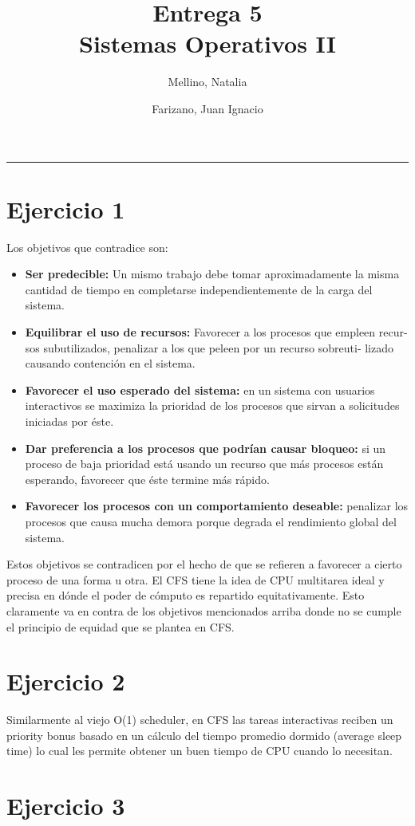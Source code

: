 \documentclass[11pt]{article}
\title{
    Entrega 5 \\
    \large Sistemas Operativos II}
\author{Mellino, Natalia \and Farizano, Juan Ignacio}
\date{}
\begin{document}
\maketitle

\noindent\rule{\textwidth}{1pt}

\section*{Ejercicio 1}

Los objetivos que contradice son:

\begin{itemize} 
    \item \textbf{Ser predecible:} Un mismo trabajo debe tomar aproximadamente la misma
          cantidad de tiempo en completarse independientemente de la carga
          del sistema.

    \item \textbf{Equilibrar el uso de recursos:} Favorecer a los procesos que empleen recur-
           sos subutilizados, penalizar a los que peleen por un recurso sobreuti-
           lizado causando contención en el sistema.

    \item \textbf{Favorecer el uso esperado del sistema:} en un sistema con usuarios interactivos
          se maximiza la prioridad de los procesos que sirvan a solicitudes iniciadas por éste.

    \item \textbf{Dar preferencia a los procesos que podrían causar bloqueo:} si un proceso de 
          baja prioridad está usando un recurso que más procesos están esperando, favorecer
          que éste termine más rápido.

    \item \textbf{Favorecer los procesos con un comportamiento deseable:} penalizar los procesos
          que causa mucha demora porque degrada el rendimiento global del sistema.
\end{itemize}

Estos objetivos se contradicen por el hecho de que se refieren a favorecer a cierto
proceso de una forma u otra. El CFS tiene la idea de CPU multitarea ideal y 
precisa en dónde el poder de cómputo es repartido equitativamente. Esto
claramente va en contra de los objetivos mencionados arriba donde no se cumple
el principio de equidad que se plantea en CFS.

\section*{Ejercicio 2}

Similarmente al viejo O(1) scheduler, en CFS las tareas interactivas reciben un
priority bonus basado en un cálculo del tiempo promedio dormido (average sleep
time) lo cual les permite obtener un buen tiempo de CPU cuando lo necesitan.

\section*{Ejercicio 3}
\end{document}
